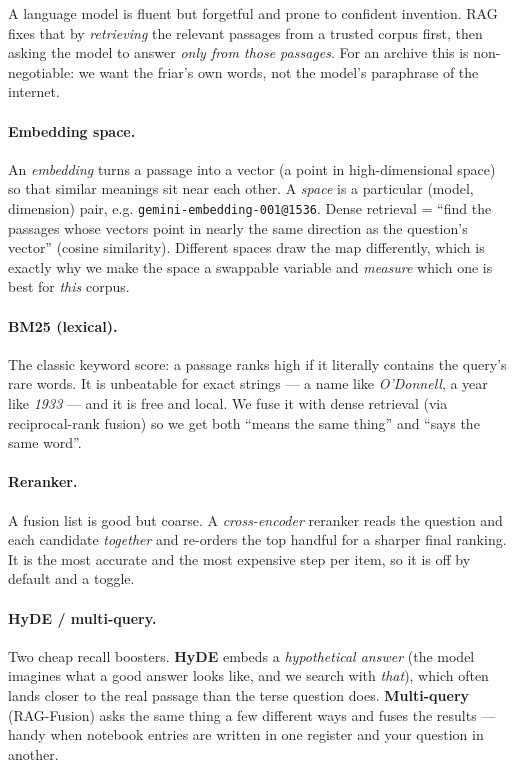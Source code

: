 \documentclass[11pt]{article}
\newcommand{\code}[1]{\texttt{#1}}
\begin{document}
\begin{primerbox}
A language model is fluent but forgetful and prone to confident invention. RAG
fixes that by \emph{retrieving} the relevant passages from a trusted corpus
first, then asking the model to answer \emph{only from those passages}. For an
archive this is non-negotiable: we want the friar's own words, not the model's
paraphrase of the internet.
\end{primerbox}

\paragraph{Embedding space.} An \emph{embedding} turns a passage into a vector
(a point in high-dimensional space) so that similar meanings sit near each
other. A \emph{space} is a particular (model, dimension) pair, e.g.
\code{gemini-embedding-001@1536}. Dense retrieval = ``find the passages whose
vectors point in nearly the same direction as the question's vector'' (cosine
similarity). Different spaces draw the map differently, which is exactly why we
make the space a swappable variable and \emph{measure} which one is best for
\emph{this} corpus.

\paragraph{BM25 (lexical).} The classic keyword score: a passage ranks high if
it literally contains the query's rare words. It is unbeatable for exact strings
--- a name like \emph{O'Donnell}, a year like \emph{1933} --- and it is free and
local. We fuse it with dense retrieval (via reciprocal-rank fusion) so we get
both ``means the same thing'' and ``says the same word''.

\paragraph{Reranker.} A fusion list is good but coarse. A \emph{cross-encoder}
reranker reads the question and each candidate \emph{together} and re-orders the
top handful for a sharper final ranking. It is the most accurate and the most
expensive step per item, so it is off by default and a toggle.

\paragraph{HyDE / multi-query.} Two cheap recall boosters. \textbf{HyDE} embeds a
\emph{hypothetical answer} (the model imagines what a good answer looks like, and
we search with \emph{that}), which often lands closer to the real passage than
the terse question does. \textbf{Multi-query} (RAG-Fusion) asks the same thing a
few different ways and fuses the results --- handy when notebook entries are
written in one register and your question in another.
\end{document}
